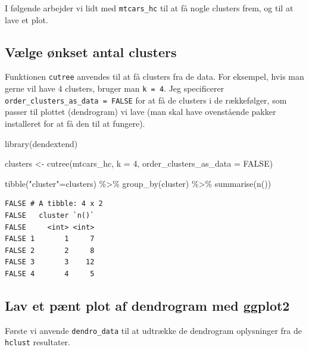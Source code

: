 \documentclass[
]{book}
\newenvironment{Shaded}{\begin{snugshade}}{\end{snugshade}}
\newcommand{\AttributeTok}[1]{\textcolor[rgb]{0.77,0.63,0.00}{#1}}
\newcommand{\ConstantTok}[1]{\textcolor[rgb]{0.00,0.00,0.00}{#1}}
\newcommand{\DecValTok}[1]{\textcolor[rgb]{0.00,0.00,0.81}{#1}}
\newcommand{\FunctionTok}[1]{\textcolor[rgb]{0.00,0.00,0.00}{#1}}
\newcommand{\NormalTok}[1]{#1}
\newcommand{\OtherTok}[1]{\textcolor[rgb]{0.56,0.35,0.01}{#1}}
\newcommand{\SpecialCharTok}[1]{\textcolor[rgb]{0.00,0.00,0.00}{#1}}
\newcommand{\StringTok}[1]{\textcolor[rgb]{0.31,0.60,0.02}{#1}}
\begin{document}
I følgende arbejder vi lidt med \texttt{mtcars\_hc} til at få nogle clusters frem, og til at lave et plot.

\hypertarget{vuxe6lge-uxf8nkset-antal-clusters}{%
\subsection{Vælge ønkset antal clusters}\label{vuxe6lge-uxf8nkset-antal-clusters}}

Funktionen \texttt{cutree} anvendes til at få clusters fra de data. For eksempel, hvis man gerne vil have 4 clusters, bruger man \texttt{k\ =\ 4}. Jeg specificerer \texttt{order\_clusters\_as\_data\ =\ FALSE} for at få de clusters i de rækkefølger, som passer til plottet (dendrogram) vi lave (man skal have ovenstående pakker installeret for at få den til at fungere).

\begin{Shaded}
\begin{Highlighting}[]
\FunctionTok{library}\NormalTok{(dendextend)}

\NormalTok{clusters }\OtherTok{\textless{}{-}} \FunctionTok{cutree}\NormalTok{(mtcars\_hc, }\AttributeTok{k =} \DecValTok{4}\NormalTok{, }\AttributeTok{order\_clusters\_as\_data =} \ConstantTok{FALSE}\NormalTok{)}

\FunctionTok{tibble}\NormalTok{(}\StringTok{"cluster"}\OtherTok{=}\NormalTok{clusters) }\SpecialCharTok{\%\textgreater{}\%} \FunctionTok{group\_by}\NormalTok{(cluster) }\SpecialCharTok{\%\textgreater{}\%} \FunctionTok{summarise}\NormalTok{(}\FunctionTok{n}\NormalTok{())}
\end{Highlighting}
\end{Shaded}

\begin{verbatim}
FALSE # A tibble: 4 x 2
FALSE   cluster `n()`
FALSE     <int> <int>
FALSE 1       1     7
FALSE 2       2     8
FALSE 3       3    12
FALSE 4       4     5
\end{verbatim}

\hypertarget{lav-et-puxe6nt-plot-af-dendrogram-med-ggplot2}{%
\subsection{Lav et pænt plot af dendrogram med ggplot2}\label{lav-et-puxe6nt-plot-af-dendrogram-med-ggplot2}}

Første vi anvende \texttt{dendro\_data} til at udtrække de dendrogram oplysninger fra de \texttt{hclust} resultater.
\end{document}
